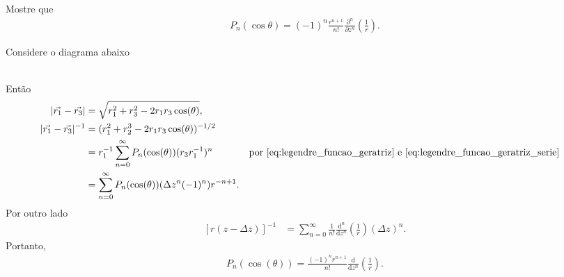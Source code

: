 \documentclass[a4paper,12pt, leqno, answers]{exam}
\begin{document}
\begin{questions}
     Mostre que
    \begin{align*}
        P_n(\cos \theta) = (-1)^n \frac{r^{n + 1}}{n!} \frac{\partial^n}{\partial z^n} \left( \frac{1}{r} \right).
    \end{align*}
    \begin{solution}
        Considere o diagrama abaixo \\ \hspace*{.2\textwidth}
         \\
        Ent\~{a}o
        \begin{align*}
            |\vec{r_1} - \vec{r_3}| &= \sqrt{r_1^2 + r_3^2 - 2 r_1 r_3 \cos(\theta)}, \\
            |\vec{r_1} - \vec{r_3}|^{-1} &= (r_1^2 + r_2^3 - 2 r_1 r_3 \cos(\theta))^{-1/2} \\
            &= r_1^{-1} \sum_{n = 0}^\infty P_n(\cos(\theta)) (r_3 r_1^{-1})^n && \text{por \eqref{eq:legendre_funcao_geratriz} e \eqref{eq:legendre_funcao_geratriz_serie}} \\
            &= \sum_{n = 0}^\infty P_n(\cos(\theta)) (\Delta z^n (-1)^n) r^{-n + 1}.
        \end{align*}
        Por outro lado
        \begin{align*}
            \left[ r (z - \Delta z) \right]^{-1} &= \sum_{n = 0}^\infty \frac{1}{n!} \frac{\mathrm{d}^n}{\mathrm{d}z^n}\left( \frac{1}{r} \right) (\Delta z)^n.
        \end{align*}
        Portanto,
        \begin{align*}
            P_n(\cos(\theta)) = \frac{(-1)^n r^{n + 1}}{n!} \frac{\mathrm{d}}{\mathrm{d}z^n}\left( \frac{1}{r} \right).
        \end{align*}
    \end{solution}


\end{questions}
\end{document}
